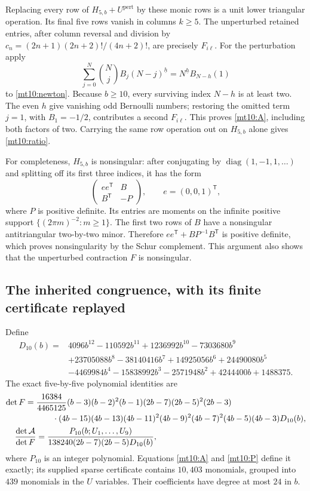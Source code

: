 Replacing every row of $H_{5,b}+U^{\mathrm{pert}}$ by these monic
rows is a unit lower triangular operation. Its final five rows vanish
in columns $k\ge5$. The unperturbed retained entries, after column
reversal and division by
$c_n=(2n+1)(2n+2)!/(4n+2)!$, are precisely $F_{i\ell}$.
For the perturbation apply
\[
 \sum_{j=0}^N\binom Nj B_j(N-j)^{\underline h}
                  =N^{\underline h}B_{N-h}(1)
\]
to \eqref{mt10:newton}. Because $b\ge10$, every surviving index
$N-h$ is at least two. The even $h$ give vanishing odd Bernoulli
numbers; restoring the omitted term $j=1$, with $B_1=-1/2$, contributes
a second $F_{i\ell}$. This proves \eqref{mt10:A}, including both
factors of two. Carrying the same row operation out on $H_{5,b}$
alone gives \eqref{mt10:ratio}.

For completeness, $H_{5,b}$ is nonsingular: after conjugating by
$\operatorname{diag}(1,-1,1,\ldots)$ and splitting off its first
three indices, it has the form
\[
 \begin{pmatrix}ee^{\mathsf T}&B\\B^{\mathsf T}&-P\end{pmatrix},
 \qquad e=(0,0,1)^{\mathsf T},
\]
where $P$ is positive definite. Its entries are moments on the infinite
positive support $\{(2\pi m)^{-2}:m\ge1\}$. The first two rows
of $B$ have a nonsingular antitriangular two-by-two minor. Therefore
$ee^{\mathsf T}+BP^{-1}B^{\mathsf T}$ is positive definite, which
proves nonsingularity by the Schur complement. This argument also
shows that the unperturbed contraction $F$ is nonsingular.

\subsection{The inherited congruence, with its finite certificate replayed}

Define
\begin{align*}
 D_{10}(b)={}&4096b^{12}-110592b^{11}+1236992b^{10}-7303680b^9\\
 &+23705088b^8-38140416b^7+14925056b^6+24490080b^5\\
 &-4469984b^4-15838992b^3-2571948b^2+4244400b+1488375.
\end{align*}
The exact five-by-five polynomial identities are
\begin{align}
 \det F={}&\frac{16384}{4465125}
 (b-3)(b-2)^2(b-1)(2b-7)(2b-5)^2(2b-3)\notag\\
 &\qquad\cdot(4b-15)(4b-13)(4b-11)^2(4b-9)^2(4b-7)^2
 (4b-5)(4b-3)D_{10}(b),\label{mt10:Fdet}\\
 \frac{\det\mathcal A}{\det F}
   &=\frac{P_{10}(b;U_1,\ldots,U_9)}{
        138240(2b-7)(2b-5)D_{10}(b)},\label{mt10:P}
\end{align}
where $P_{10}$ is an integer polynomial. Equations \eqref{mt10:A}
and \eqref{mt10:P} define it exactly; its supplied sparse certificate
contains $10{,}403$ monomials, grouped into $439$ monomials in the
$U$ variables. Their coefficients have degree at most $24$ in $b$.

